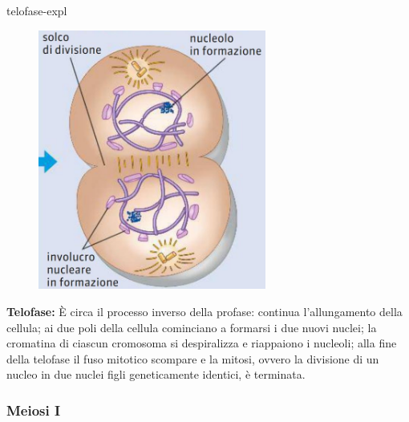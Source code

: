 \documentclass[preview]{standalone}
\begin{document}
\begin{snippet}{telofase-expl}
    \setlength{\intextsep}{0pt}%
    \begin{figure}
        \includegraphics[width=7.5cm]{./resources/telofase.jpg}
        \vspace{-1cm}
    \end{figure}

    \textbf{Telofase:}
    È circa il processo inverso della profase: continua l'allungamento della cellula; ai due poli
    della cellula cominciano a formarsi i due nuovi nuclei; la cromatina di ciascun cromosoma
    si despiralizza e riappaiono i nucleoli; alla fine della telofase il fuso mitotico scompare e la
    mitosi, ovvero la divisione di un nucleo in due nuclei figli geneticamente identici, è terminata.
    \wrapfill
\end{snippet}

\subsubsection{Meiosi I}

\end{document}
